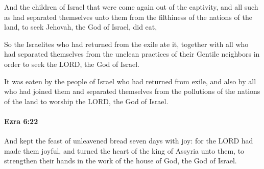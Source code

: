 			\begin{versebox}
					\item[BHS] 
					\item[LXX] 
					\item[ASV] And the children of Israel that were come again out of the captivity, and all such as had separated themselves unto them from the filthiness of the nations of the land, to seek Jehovah, the God of Israel, did eat,
					\item[NIV] So the Israelites who had returned from the exile ate it, together with all who had separated themselves from the unclean practices of their Gentile neighbors in order to seek the LORD, the God of Israel.
					\item[NRSV] It was eaten by the people of Israel who had returned from exile, and also by all who had joined them and separated themselves from the pollutions of the nations of the land to worship the LORD, the God of Israel.
			\end{versebox}

		\paragraph{Ezra 6:22} %
			\label{EZRA-6-22}

			And kept the feast of unleavened bread seven days with joy: for the LORD had made them joyful, and turned the heart of the king of Assyria unto them, to strengthen their hands in the work of the house of God, the God of Israel.


